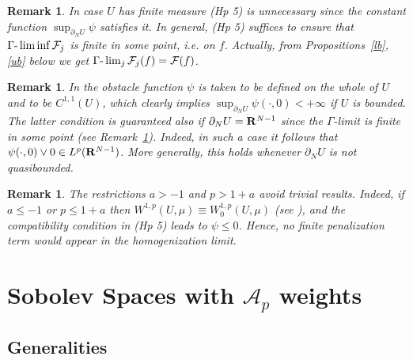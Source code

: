 \documentclass[10pt,reqno]{amsart}
\numberwithin{equation}{section}
\def\R{{\bf R}}
\def\Wsp{W^{1,p}}
\def\Wspo{W_0^{1,p}}
\def\FFjpsi{{\mathcal F}_j}
\def\FFpsi{{\mathcal F}}
\def\UU{\partial_NU}
\newtheorem{remark}[theorem]{Remark}
\begin{document}
\begin{remark}\label{uncont1}
In case $U$ has finite measure 
(Hp 5) is unnecessary since the constant function 
$\sup_{\UU}\psi$ satisfies it. In general, (Hp 5) suffices to ensure that 
$\Gamma\hbox{-}\liminf\FFjpsi$ is finite in some point, i.e. on $f$.
Actually, from Propositions~\ref{lb}, \ref{ub} below we get
$\Gamma\hbox{-}\lim_j\FFjpsi(f)=\FFpsi(f)$.
\end{remark}

\begin{remark}\label{uncont}
In \cite{Caf-Mel2} the obstacle function $\psi$ is taken to be 
defined on the whole of $U$ and to be $C^{1,1}(U)$, which clearly
implies $\sup_{\UU}\psi(\cdot,0)<+\infty$ if $U$ is bounded. 
The latter condition
is guaranteed also if $\UU=\R^{N-1}$ since the $\Gamma$-limit is finite 
in some point (see Remark~\ref{uncont1}).
Indeed, in such a case it follows that $\psi(\cdot,0)\vee 0\in L^p(\R^{N-1})$.
More generally, this holds whenever $\UU$ is not quasibounded.
\end{remark} 

\begin{remark}\label{trivial}
 The restrictions $a>-1$ and $p> 1+a$ avoid trivial results.
Indeed, if $a\leq-1$ or $p\leq 1+a$ then $\Wsp(U,\mu)\equiv\Wspo(U,\mu)$
(see \cite[Proposition 9.10]{Kuf}),
and the compatibility condition in (Hp 5) leads to $\psi\leq 0$.
Hence, no finite penalization term would appear in the homogenization limit.
\end{remark}



\section{Sobolev Spaces with $\mathcal{A}_p$ weights}\label{sobolev}


\subsection{Generalities}
\end{document}
